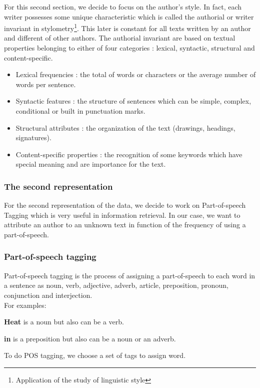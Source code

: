 \label{lab:data2}

For this second section, we decide to focus on the author's style. In fact, each writer possesses some unique characteristic which is called the authorial or writer invariant in stylometry\footnote{Application of the study of linguistic style}. This later is constant for all texts written by an author and different of other authors. The authorial invariant are based on textual properties belonging to either of four categories : lexical, syntactic, structural and content-specific.
\begin{itemize}
	\item Lexical frequencies : the total of words or characters or the average number of words per sentence.
	\item Syntactic features : the structure of sentences which can be simple, complex, conditional or built in punctuation marks. 
	\item Structural attributes : the organization of the text (drawings, headings, signatures).
	\item Content-specific properties : the recognition of some keywords which have special meaning and are importance for the text.
\end{itemize} 

\subsubsection{The second representation}
For the second representation of the data, we decide to work on Part-of-speech Tagging which is very useful in information retrieval. In our case, we want to attribute an author to an unknown text in function of the frequency of using a part-of-speech. 

\subsubsection{Part-of-speech tagging}
Part-of-speech tagging is the process of assigning a part-of-speech to each word in a sentence as noun, verb, adjective, adverb, article, preposition, pronoun, conjunction and interjection.\\

For examples:

\textbf{Heat} is a noun but also can be a verb.

\textbf{in} is a preposition but also can be a noun or an adverb.

To do POS tagging, we choose a set of tags to assign word.

